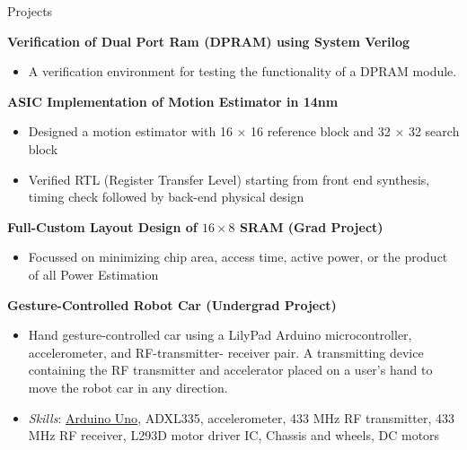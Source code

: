 \documentclass[]{mcdowellcv}
\begin{document}
        \begin{cvsection}{Projects}
        \begin{cvsubsection}{}{}{}
           \textbf{Verification of Dual Port Ram (DPRAM) using System Verilog}
             \begin{itemize}
           \item A verification environment for testing the functionality of a DPRAM module.
            \end{itemize} 
        \end{cvsubsection}{}{}{}
        \begin{cvsubsection}{}{}{}
            \textbf{ASIC Implementation of Motion Estimator in 14nm }
            \begin{itemize}
            \item Designed a motion estimator with 16 × 16 reference block and 32 × 32 search block
            \item Verified RTL (Register Transfer Level) starting from front end synthesis, timing check followed by back-end physical design 
            \end{itemize}  
        \end{cvsubsection}{}{}{}
        \begin{cvsubsection}{}{}{}
            \textbf{Full-Custom Layout Design of $16 \times 8$ SRAM (Grad Project)}
            \begin{itemize}
                \item Focussed on minimizing chip area, access time, active power, or the product of all
                 Power Estimation 
                 \end{itemize}
        \end{cvsubsection}{}{}{}
          \begin{cvsubsection}{}{}{}
            \textbf{Gesture-Controlled Robot Car (Undergrad Project)}
            \begin{itemize}
                \item Hand gesture-controlled car using a
                LilyPad Arduino microcontroller, accelerometer, and RF-transmitter-
                receiver pair. A transmitting device containing the RF transmitter and accelerator placed on a user’s hand to move the robot car in any direction.
                \item \textit{Skills}: \href{https://en.wikipedia.org/wiki/Arduino_Uno}{Arduino Uno}, ADXL335, accelerometer, 433 MHz RF transmitter, 433 MHz RF receiver, L293D motor driver IC, Chassis and wheels, DC motors
                \end{itemize}
        \end{cvsubsection}{}{}{}    
         \end{cvsection}
\end{document}

